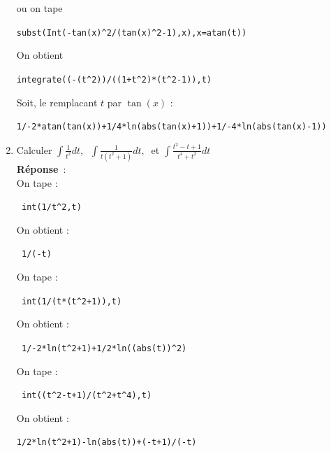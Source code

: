 \documentclass{article}
\begin{document}
\begin{enumerate}
ou on tape
\begin{center}
\verb|subst(Int(-tan(x)^2/(tan(x)^2-1),x),x=atan(t))|
\end{center}
On obtient 
\begin{center}
\verb|integrate((-(t^2))/((1+t^2)*(t^2-1)),t)|
\end{center}
Soit, le remplacant $t$ par $\tan(x)$ :
\begin{center}
\verb|1/-2*atan(tan(x))+1/4*ln(abs(tan(x)+1))+1/-4*ln(abs(tan(x)-1))|
\end{center}
\item  Calculer $\displaystyle\int \frac{1}{t^2}dt,\ $ 
$\displaystyle\int \frac{1}{t(t^2+1)}dt,\ $ et
$\displaystyle\int \frac{t^2-t+1}{t^4+t^2}dt$\\
{\bf R\'eponse}~:\\
On tape :
\begin{center}
\verb| int(1/t^2,t)|
\end{center}
On obtient :
\begin{center}
\verb| 1/(-t)|
\end{center}
On tape :
\begin{center}
\verb| int(1/(t*(t^2+1)),t)|
\end{center}
On obtient :
\begin{center}
\verb| 1/-2*ln(t^2+1)+1/2*ln((abs(t))^2)|
\end{center}
On tape :
\begin{center}
\verb| int((t^2-t+1)/(t^2+t^4),t)|
\end{center}
On obtient :
\begin{center}
\verb|1/2*ln(t^2+1)-ln(abs(t))+(-t+1)/(-t)|
\end{center}
\end{enumerate}
\end{document}
